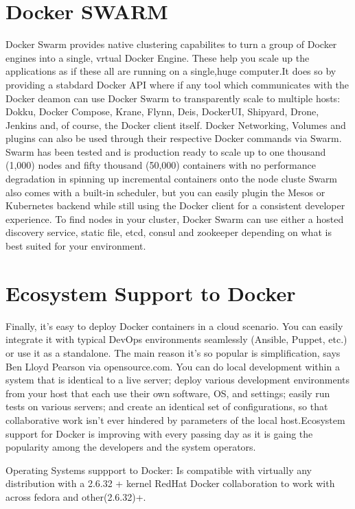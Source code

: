 \documentclass[9pt,twocolumn,twoside]{styles/osajnl}
\begin{document}
\section{Docker SWARM}
\cite{www-docker-swarm}Docker Swarm provides native clustering 
capabilites to turn a group of Docker engines into a single, vrtual 
Docker Engine. These help you scale up the applications as if these all 
are running on a single,huge computer.It does so by
providing a stabdard Docker API where if any tool which communicates
with the Docker deamon can use Docker Swarm to transparently scale to
multiple hosts: Dokku, Docker Compose, Krane, Flynn, Deis, DockerUI,
Shipyard, Drone, Jenkins and, of course, the Docker client itself.
Docker Networking, Volumes and plugins can also be used through their
respective Docker commands via Swarm. Swarm has been tested and is
production ready to scale up to one thousand (1,000) nodes and fifty
thousand (50,000) containers with no performance degradation in
spinning up incremental containers onto the node cluste Swarm also
comes with a built-in scheduler, but you can easily plugin the Mesos
or Kubernetes backend while still using the Docker client for a
consistent developer experience. To find nodes in your cluster, Docker
Swarm can use either a hosted discovery service, static file, etcd,
consul and zookeeper depending on what is best suited for your
environment.


\section{Ecosystem Support to Docker}
\cite{www-docker-1}Finally, it’s easy to deploy Docker containers in a cloud
scenario. You can easily integrate it with typical DevOps environments
seamlessly (Ansible, Puppet, etc.) or use it as a standalone. The main
reason it’s so popular is simplification, says Ben Lloyd Pearson via
opensource.com. You can do local development within a system that is
identical to a live server; deploy various development environments
from your host that each use their own software, OS, and settings;
easily run tests on various servers; and create an identical set of
configurations, so that collaborative work isn’t ever hindered by
parameters of the local host.Ecosystem support for Docker is
improving with every passing day as it is gaing the popularity among
the developers and the system operators.

Operating Systems suppport to Docker: Is compatible with virtually
any distribution with a 2.6.32 + kernel RedHat Docker collaboration to
work with across fedora and other(2.6.32)+.
\end{document}
